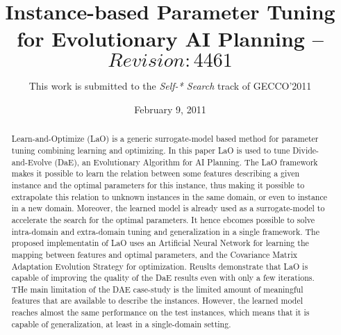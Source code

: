 \documentclass{acm_proc_article-sp}
\begin{document}
\title{Instance-based Parameter Tuning\\
for Evolutionary AI Planning -- $Revision: 4461$}


\author{This work is submitted to the {\large \em Self-* Search} track of GECCO'2011}

% 

\date{February 9, 2011}
\maketitle
\begin{abstract}
\noindent Learn-and-Optimize (LaO) is a generic surrogate-model based method for parameter tuning combining learning and optimizing. In this paper LaO is used to tune Divide-and-Evolve (DaE), an Evolutionary Algorithm for AI Planning. The LaO framework makes it possible to learn the relation between some features describing a given instance and the optimal parameters for this instance, thus making it possible to extrapolate this relation to unknown instances in the same domain, or even to instance in a new domain. Moreover, the learned model is already used as a surrogate-model to accelerate the search for the optimal parameters. It hence ebcomes possible to solve intra-domain and extra-domain tuning and generalization in a single framework. The proposed implementatin of LaO uses an Artificial Neural Network for learning the mapping between features and optimal parameters, and the Covariance Matrix Adaptation Evolution Strategy for optimization. Reuslts demonstrate that LaO is capable of improving the quality of the DaE results even with only a few iterations. THe main limitation of the DAE case-study is the limited amount of meaningful features that are available to describe the instances. However, the learned model reaches almost the same performance on the test instances, which means that it is capable of generalization, at least in a single-domain setting. 

\end{abstract}
\end{document}
